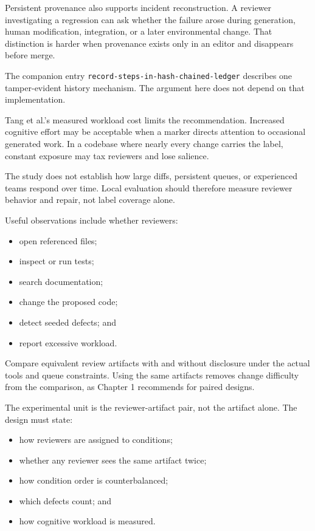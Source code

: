 Persistent provenance also supports incident reconstruction. A reviewer investigating a regression can ask whether the failure arose during generation, human modification, integration, or a later environmental change. That distinction is harder when provenance exists only in an editor and disappears before merge.

The companion entry \texttt{record-steps-in-hash-chained-ledger} describes one tamper-evident history mechanism. The argument here does not depend on that implementation.

Tang et al.'s measured workload cost limits the recommendation. Increased cognitive effort may be acceptable when a marker directs attention to occasional generated work. In a codebase where nearly every change carries the label, constant exposure may tax reviewers and lose salience.

The study does not establish how large diffs, persistent queues, or experienced teams respond over time. Local evaluation should therefore measure reviewer behavior and repair, not label coverage alone.

Useful observations include whether reviewers:

\begin{itemize}
\tightlist
\item
  open referenced files;
\item
  inspect or run tests;
\item
  search documentation;
\item
  change the proposed code;
\item
  detect seeded defects; and
\item
  report excessive workload.
\end{itemize}

Compare equivalent review artifacts with and without disclosure under the actual tools and queue constraints. Using the same artifacts removes change difficulty from the comparison, as Chapter 1 recommends for paired designs.

The experimental unit is the reviewer-artifact pair, not the artifact alone. The design must state:

\begin{itemize}
\tightlist
\item
  how reviewers are assigned to conditions;
\item
  whether any reviewer sees the same artifact twice;
\item
  how condition order is counterbalanced;
\item
  which defects count; and
\item
  how cognitive workload is measured.
\end{itemize}

